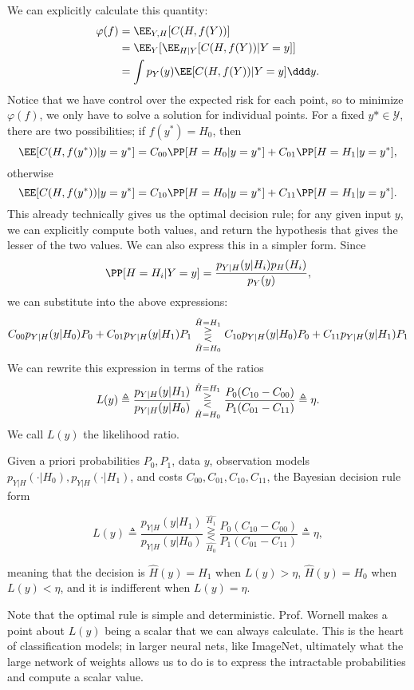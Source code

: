 We can explicitly calculate this quantity: 
\begin{align*}
	\varphi(f) &= \EE_{Y,H}[C(H, f(Y))] \\
						 &= \EE_{Y}[\EE_{H|Y}[C(H, f(Y)) | Y=y]] \\
						 &= \int p_Y(y) \EE[C(H, f(Y)) | Y=y] \ddd y.
\end{align*}
Notice that we have control over the expected risk for each point, so to minimize $\varphi(f)$, we only have to solve a solution for individual points. For a fixed $y*\in \mathcal{Y}$, there are two possibilities; if $f(y^*) = H_0$, then 
\[\EE[C(H,f(y^*)) | y=y^*] = C_{00}\PP[H=H_0 | y=y^*] + C_{01}\PP[H=H_1 | y=y^*],\] 
otherwise
\[\EE[C(H, f(y^*)) | y=y^*] = C_{10}\PP[H=H_0 | y=y^*] + C_{11}\PP[H=H_1 | y=y^*].\]
This already technically gives us the optimal decision rule; for any given input $y$, we can explicitly compute both values, and return the hypothesis that gives the lesser of the two values. We can also express this in a simpler form. Since
\[\PP[H=H_i | Y=y] = \frac{p_{Y|H}(y|H_i)p_{H}(H_i)}{p_Y(y)},\]
we can substitute into the above expressions: 
\[C_{00}p_{Y|H}(y|H_0)P_0 + C_{01}p_{Y|H}(y|H_1)P_1 \overunderset{\hat{H}=H_1}{\hat{H}=H_0}{\gtreqless} C_{10}p_{Y|H}(y|H_0)P_0 + C_{11}p_{Y|H}(y|H_1)P_1\] 
We can rewrite this expression in terms of the ratios 
\[L(y) \triangleq \frac{p_{Y|H}(y|H_1)}{p_{Y|H}(y|H_0)} \overunderset{\hat{H}=H_1}{\hat{H}=H_0}{\gtreqless} \frac{P_0(C_{10}-C_{00})}{P_1(C_{01}-C_{11})} \triangleq \eta.\] 
We call $L(y)$ the \ac{likelihood ratio}. 

\begin{theorem}

Given a priori probabilities $P_0,P_1$, data $y$, observation models $p_{Y|H}(\cdot|H_0), p_{Y|H}(\cdot|H_1)$, and costs $C_{00}, C_{01}, C_{10}, C_{11}$, the Bayesian decision rule form 

\[L(y) \triangleq \frac{p_{Y|H}(y|H_1)}{p_{Y|H}(y|H_0)} \underset{\hat{H_0}}{\overset{\hat{H_1}}{\gtreqless}} \frac{P_0(C_{10}-C_{00})}{P_1(C_{01}-C_{11})} \triangleq \eta,\] 

meaning that the decision is $\hat{H}(y) = H_1$ when $L(y) > \eta$, $\hat{H}(y) = H_0$ when $L(y) < \eta$, and it is indifferent when $L(y)=\eta$. 
\end{theorem}

Note that the optimal rule is simple and deterministic. Prof. Wornell makes a point about $L(y)$ being a scalar that we can always calculate. This is the heart of classification models; in larger neural nets, like ImageNet, ultimately what the large network of weights allows us to do is to express the intractable probabilities and compute a scalar value. 

